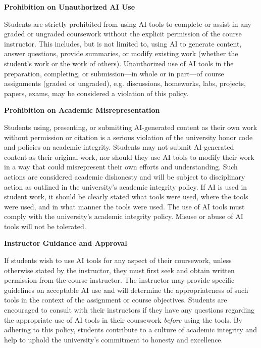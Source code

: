 \documentclass[11pt,letterpaper]{article}
\begin{document}
{\bfseries Prohibition on Unauthorized AI Use} \par
Students are strictly prohibited from using AI tools to complete or assist in any graded or ungraded coursework without the explicit permission of the course instructor. This includes, but is not limited to, using AI to generate content, answer questions, provide summaries, or modify existing work (whether the student's work or the work of others). Unauthorized use of AI tools in the preparation, completing, or submission---in whole or in part---of course assignments (graded or ungraded), e.g. discussions, homeworks, labs, projects, papers, exams, may be considered a violation of this policy. \pspace

{\bfseries Prohibition on Academic Misrepresentation} \par
Students using, presenting, or submitting AI-generated content as their own work without permission or citation is a serious violation of the university honor code and policies on academic integrity. Students may not submit AI-generated content as their original work, nor should they use AI tools to modify their work in a way that could misrepresent their own efforts and understanding. Such actions are considered academic dishonesty and will be subject to disciplinary action as outlined in the university's academic integrity policy. If AI is used in student work, it should be clearly stated what tools were used, where the tools were used, and in what manner the tools were used. The use of AI tools must comply with the university's academic integrity policy. Misuse or abuse of AI tools will not be tolerated. \pspace

{\bfseries Instructor Guidance and Approval} \par
If students wish to use AI tools for any aspect of their coursework, unless otherwise stated by the instructor, they must first seek and obtain written permission from the course instructor. The instructor may provide specific guidelines on acceptable AI use and will determine the appropriateness of such tools in the context of the assignment or course objectives. Students are encouraged to consult with their instructors if they have any questions regarding the appropriate use of AI tools in their coursework \textit{before} using the tools. By adhering to this policy, students contribute to a culture of academic integrity and help to uphold the university's commitment to honesty and excellence. 
\sectionbreak
\end{document}
